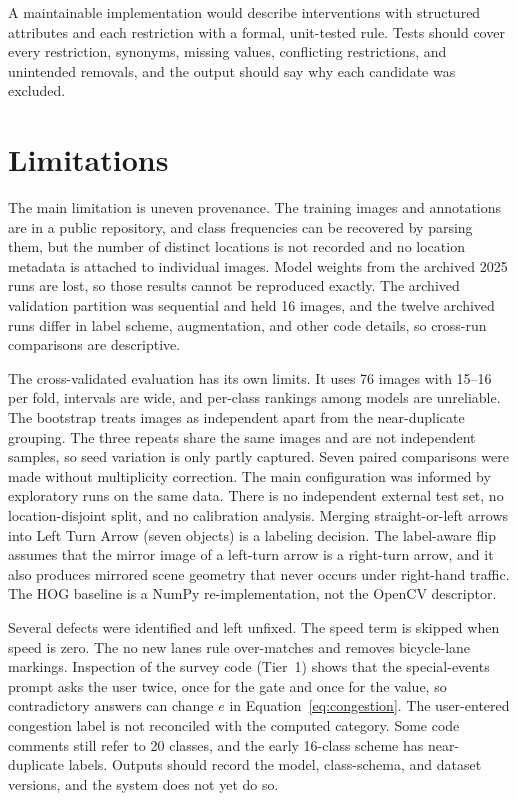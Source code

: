 \documentclass[11pt]{article}
\begin{document}
A maintainable implementation would describe interventions with structured attributes and each restriction with a formal, unit-tested rule. Tests should cover every restriction, synonyms, missing values, conflicting restrictions, and unintended removals, and the output should say why each candidate was excluded.

\section{Limitations}
\label{sec:limitations}
The main limitation is uneven provenance. The training images and annotations are in a public repository, and class frequencies can be recovered by parsing them, but the number of distinct locations is not recorded and no location metadata is attached to individual images. Model weights from the archived 2025 runs are lost, so those results cannot be reproduced exactly. The archived validation partition was sequential and held 16 images, and the twelve archived runs differ in label scheme, augmentation, and other code details, so cross-run comparisons are descriptive.

The cross-validated evaluation has its own limits. It uses 76 images with 15--16 per fold, intervals are wide, and per-class rankings among models are unreliable. The bootstrap treats images as independent apart from the near-duplicate grouping. The three repeats share the same images and are not independent samples, so seed variation is only partly captured. Seven paired comparisons were made without multiplicity correction. The main configuration was informed by exploratory runs on the same data. There is no independent external test set, no location-disjoint split, and no calibration analysis. Merging straight-or-left arrows into Left Turn Arrow (seven objects) is a labeling decision. The label-aware flip assumes that the mirror image of a left-turn arrow is a right-turn arrow, and it also produces mirrored scene geometry that never occurs under right-hand traffic. The HOG baseline is a NumPy re-implementation, not the OpenCV descriptor.

Several defects were identified and left unfixed. The speed term is skipped when speed is zero. The no new lanes rule over-matches and removes bicycle-lane markings. Inspection of the survey code (Tier~1) shows that the special-events prompt asks the user twice, once for the gate and once for the value, so contradictory answers can change $e$ in Equation~\ref{eq:congestion}. The user-entered congestion label is not reconciled with the computed category. Some code comments still refer to 20 classes, and the early 16-class scheme has near-duplicate labels. Outputs should record the model, class-schema, and dataset versions, and the system does not yet do so.
\end{document}
